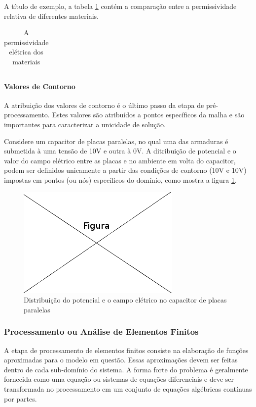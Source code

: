 A título de exemplo, a tabela \ref{tab:permissividade} contém a comparação entre a permissividade relativa de diferentes materiais.

\begin{table}	
	\centering
	\begin{tabular}{|c|c|}	

	\end{tabular}
	\caption{A permissividade elétrica dos materiais}
	\label{tab:permissividade}
\end{table}


\paragraph{Valores de Contorno \\}
A atribuição dos valores de contorno é o último passo da etapa de pré- processamento. Estes valores são atribuídos a pontos específicos da malha e são importantes para caracterizar a unicidade de solução.

Considere um capacitor de placas paralelas, no qual uma das armaduras é submetida à uma tensão de 10V e outra à 0V. A ditribuição de potencial e o valor do campo elétrico entre as placas e no ambiente em volta do capacitor, podem ser definidos unicamente a partir das condições de contorno (10V e 10V) impostas em pontos (ou nós) específicos do domínio, como mostra a figura \ref{fig:capacitor}.

\begin{figure}[!htb]
\centering
\includegraphics[scale=0.5]{figuras/temp.png}
\caption{Distribuição do potencial e o campo elétrico no capacitor de placas paralelas}
\label{fig:capacitor}
\end{figure}

\subsubsection{Processamento ou Análise de Elementos Finitos}
A etapa de processamento de elementos finitos consiste na elaboração de funções aproximadas para o modelo em questão. Essas aproximações devem ser feitas dentro de cada sub-domínio do sistema. A forma forte do problema é geralmente fornecida como uma equação ou sistemas de equações diferenciais e deve ser transformada no processamento em um conjunto de equações algébricas contínuas por partes.

